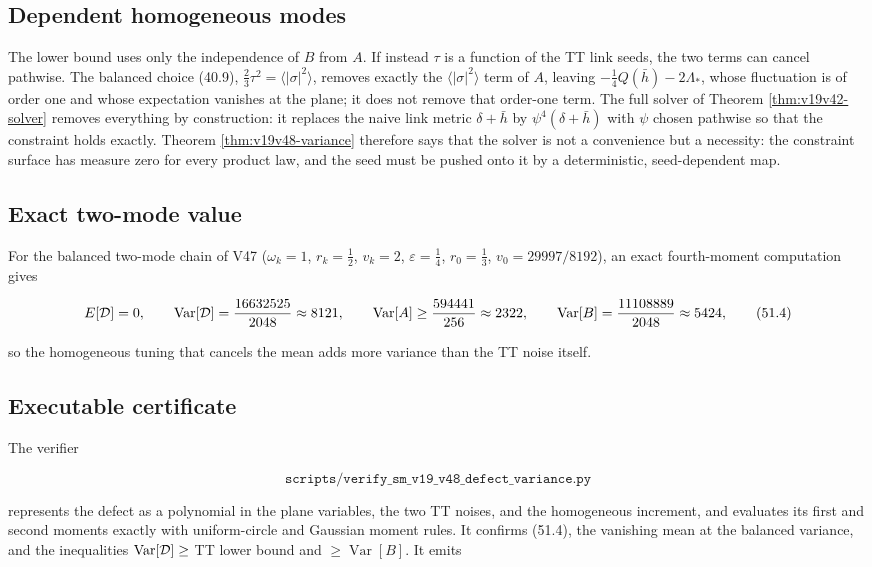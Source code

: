 \documentclass[11pt]{article}
\theoremstyle{remark}
\begin{document}
\subsection{Dependent homogeneous modes}

The lower bound uses only the independence of \(B\) from \(A\).  If
instead \(\tau\) is a function of the TT link seeds, the two terms can
cancel pathwise.  The balanced choice (40.9),
\(\tfrac23\tau^2=\langle|\sigma|^2\rangle\), removes exactly the
\(\langle|\sigma|^2\rangle\) term of \(A\), leaving
\(-\tfrac14Q(\bar h)-2\Lambda_*\), whose fluctuation is of order one and
whose expectation vanishes at the plane; it does not remove that
order-one term.  The full solver of Theorem \ref{thm:v19v42-solver}
removes everything by construction: it replaces the naive link metric
\(\delta+\bar h\) by \(\psi^4(\delta+\bar h)\) with \(\psi\) chosen
pathwise so that the constraint holds exactly.  Theorem
\ref{thm:v19v48-variance} therefore says that the solver is not a
convenience but a necessity: the constraint surface has measure zero
for every product law, and the seed must be pushed onto it by a
deterministic, seed-dependent map.

\subsection{Exact two-mode value}

For the balanced two-mode chain of V47 (\(\omega_k=1\), \(r_k=\tfrac12\),
\(v_k=2\), \(\varepsilon=\tfrac14\), \(r_0=\tfrac13\),
\(v_0=29997/8192\)), an exact fourth-moment computation gives

\[
 E[{\cal D}]=0,\qquad
 \operatorname{Var}[{\cal D}]=\frac{16632525}{2048}\approx8121,
 \qquad
 \operatorname{Var}[A]\geq\frac{594441}{256}\approx2322,
 \qquad
 \operatorname{Var}[B]=\frac{11108889}{2048}\approx5424,               \tag{51.4}
\]

so the homogeneous tuning that cancels the mean adds more variance than
the TT noise itself.

\subsection{Executable certificate}

The verifier

\[
 \texttt{scripts/verify\_sm\_v19\_v48\_defect\_variance.py}          \tag{51.5}
\]

represents the defect as a polynomial in the plane variables, the two
TT noises, and the homogeneous increment, and evaluates its first and
second moments exactly with uniform-circle and Gaussian moment rules.
It confirms (51.4), the vanishing mean at the balanced variance, and
the inequalities \(\operatorname{Var}[{\cal D}]\geq\) TT lower bound and
\(\geq\operatorname{Var}[B]\).  It emits
\end{document}
